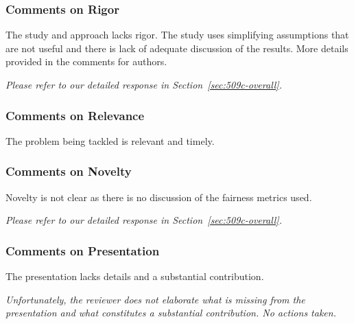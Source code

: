 \documentclass[conference,review,anonymous]{IEEEtran}
\newcommand{\highlight}[1]{\begin{framed}%
  \noindent\emph{#1}
\end{framed}}
\begin{document}
\subsubsection{Comments on Rigor}

The study and approach lacks rigor. The study uses simplifying
assumptions that are not useful and there is lack of adequate
discussion of the results. More details provided in the comments for
authors.

\highlight{Please refer to our detailed response in
Section~\ref{sec:509c-overall}.}

\subsubsection{Comments on Relevance}
The problem being tackled is relevant and timely.

\subsubsection{Comments on Novelty}
Novelty is not clear as there is no discussion of the fairness metrics
used.

\highlight{Please refer to our detailed response in
Section~\ref{sec:509c-overall}.}

\subsubsection{Comments on Presentation}
The presentation lacks details and a substantial contribution.

\highlight{Unfortunately, the reviewer does not elaborate what is
missing from the presentation and what constitutes a substantial
contribution. No actions taken.}
\end{document}
